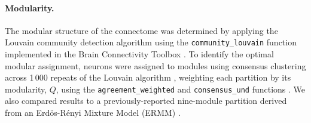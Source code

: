 \documentclass[10pt,letterpaper]{article}
\begin{document}
\paragraph{Modularity.}
The modular structure of the connectome was determined by applying the Louvain community detection algorithm \cite{Blondel:2008do} using the \texttt{community\_louvain} function implemented in the Brain Connectivity Toolbox \cite{Rubinov:2010jd}.
To identify the optimal modular assignment, neurons were assigned to modules using consensus clustering across 1\,000 repeats of the Louvain algorithm \cite{Lancichinetti2012}, weighting each partition by its modularity, $Q$, using the \texttt{agreement\_weighted} and \texttt{consensus\_und} functions \cite{Rubinov:2010jd}.
We also compared results to a previously-reported nine-module partition derived from an Erd\"os-R\'enyi Mixture Model (ERMM) \cite{Pavlovic:2014gx}.


\end{document}
